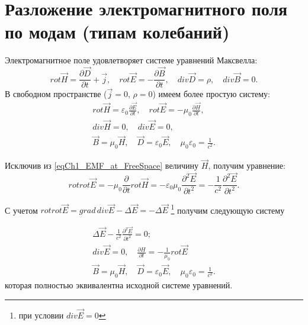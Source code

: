 \section{Разложение электромагнитного поля по модам (типам колебаний)}
Электромагнитное поле удовлетворяет системе уравнений Максвелла:
\begin{equation}
rot \vec{H} = \frac{\partial \vec{D}}{\partial t} + \vec{j}, 
\quad
rot \vec{E} = - \frac{\partial \vec{B}}{\partial t}, 
\quad
div \vec{D} = \rho, \quad
div \vec{B} = 0.
\end{equation}
В свободном пространстве  ($\vec{j} = 0$, $\rho = 0$)  имеем более
простую систему: 
\begin{eqnarray}
rot \vec{H} = \varepsilon_0 \frac{\partial \vec{E}}{\partial t}, 
\quad
rot \vec{E} = - \mu_0 \frac{\partial \vec{H}}{\partial t}, 
\nonumber \\
div \vec{H} = 0,
\quad
div \vec{E} = 0, 
\nonumber \\
\vec{B} = \mu_0 \vec{H}, 
\quad 
\vec{D} = \varepsilon_0 \vec{E}, 
\quad
\mu_0 \varepsilon_0 = \frac{1}{c^2}.
\label{eqCh1_EMF_at_FreeSpace}
\end{eqnarray}

Исключив из \eqref{eqCh1_EMF_at_FreeSpace} величину $\vec{H}$,  получим
уравнение:
\begin{equation}
rot rot \vec{E} = - \mu_0 \frac{\partial}{\partial t} rot \vec{H} = -
\varepsilon_0 \mu_0 \frac{\partial^2 \vec{E}}{\partial t^2} = 
- \frac{1}{c^2} \frac{\partial^2 \vec{E}}{\partial t^2}.
\nonumber
\end{equation}

С учетом $rot rot \vec{E} = grad \, div \vec{E} - \Delta \vec{E} = - \Delta
\vec{E}$ \footnote{при условии $div \vec E = 0$} получим следующую систему

\begin{eqnarray}
\Delta \vec{E} - \frac{1}{c^2} \frac{\partial^2 \vec{E}}{\partial t^2}
= 0;
\nonumber \\
div \vec{E} = 0, 
\quad
\frac{\partial H}{\partial t} = - \frac{1}{\mu_0} rot \vec{E}
\nonumber \\
\vec{B} = \mu_0 \vec{H}, \quad \vec{D} = \varepsilon_0 \vec{E}, \quad \mu_0
\varepsilon_0 = \frac{1}{c^2}.
\label{eqCh1_EMF_at_FreeSpace2}
\end{eqnarray}
которая полностью эквивалентна исходной системе уравнений. 

